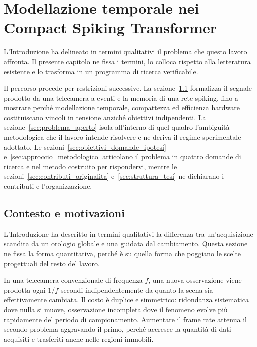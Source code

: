 \chapter{Modellazione temporale nei Compact Spiking Transformer}
\label{chap:contesto_problema}

L'Introduzione ha delineato in termini qualitativi il problema che questo lavoro affronta. Il presente capitolo ne fissa i termini, lo colloca rispetto alla letteratura esistente e lo trasforma in un programma di ricerca verificabile.

Il percorso procede per restrizioni successive. La sezione~\ref{sec:contesto_motivazioni} formalizza il segnale prodotto da una telecamera a eventi e la memoria di una rete spiking, fino a mostrare perché modellazione temporale, compattezza ed efficienza hardware costituiscano vincoli in tensione anziché obiettivi indipendenti. La sezione~\ref{sec:problema_aperto} isola all'interno di quel quadro l'ambiguità metodologica che il lavoro intende risolvere e ne deriva il regime sperimentale adottato. Le sezioni~\ref{sec:obiettivi_domande_ipotesi} e~\ref{sec:approccio_metodologico} articolano il problema in quattro domande di ricerca e nel metodo costruito per rispondervi, mentre le sezioni~\ref{sec:contributi_originalita} e~\ref{sec:struttura_tesi} ne dichiarano i contributi e l'organizzazione.




\section{Contesto e motivazioni}
\label{sec:contesto_motivazioni}

L'Introduzione ha descritto in termini qualitativi la differenza tra un'acquisizione scandita da un orologio globale e una guidata dal cambiamento. Questa sezione ne fissa la forma quantitativa, perché è su quella forma che poggiano le scelte progettuali del resto del lavoro.

In una telecamera convenzionale di frequenza $f$, una nuova osservazione viene prodotta ogni $1/f$ secondi indipendentemente da quanto la scena sia effettivamente cambiata. Il costo è duplice e simmetrico: ridondanza sistematica dove nulla si muove, osservazione incompleta dove il fenomeno evolve più rapidamente del periodo di campionamento. Aumentare il frame rate attenua il secondo problema aggravando il primo, perché accresce la quantità di dati acquisiti e trasferiti anche nelle regioni immobili.

